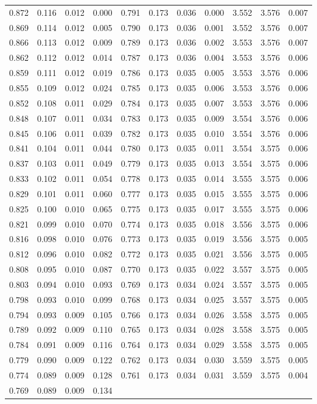 \begin{table}[H]
\begin{tabular}{rrrrrrrrrrr}
        0.872 & 0.116 & 0.012 & 0.000 & 0.791 & 0.173 & 0.036 & 0.000 & 3.552 & 3.576 & 0.007 \\0.869 & 0.114 & 0.012 & 0.005 & 0.790 & 0.173 & 0.036 & 0.001 & 3.552 & 3.576 & 0.007 \\0.866 & 0.113 & 0.012 & 0.009 & 0.789 & 0.173 & 0.036 & 0.002 & 3.553 & 3.576 & 0.007 \\0.862 & 0.112 & 0.012 & 0.014 & 0.787 & 0.173 & 0.036 & 0.004 & 3.553 & 3.576 & 0.006 \\0.859 & 0.111 & 0.012 & 0.019 & 0.786 & 0.173 & 0.035 & 0.005 & 3.553 & 3.576 & 0.006 \\0.855 & 0.109 & 0.012 & 0.024 & 0.785 & 0.173 & 0.035 & 0.006 & 3.553 & 3.576 & 0.006 \\0.852 & 0.108 & 0.011 & 0.029 & 0.784 & 0.173 & 0.035 & 0.007 & 3.553 & 3.576 & 0.006 \\0.848 & 0.107 & 0.011 & 0.034 & 0.783 & 0.173 & 0.035 & 0.009 & 3.554 & 3.576 & 0.006 \\0.845 & 0.106 & 0.011 & 0.039 & 0.782 & 0.173 & 0.035 & 0.010 & 3.554 & 3.576 & 0.006 \\0.841 & 0.104 & 0.011 & 0.044 & 0.780 & 0.173 & 0.035 & 0.011 & 3.554 & 3.575 & 0.006 \\0.837 & 0.103 & 0.011 & 0.049 & 0.779 & 0.173 & 0.035 & 0.013 & 3.554 & 3.575 & 0.006 \\0.833 & 0.102 & 0.011 & 0.054 & 0.778 & 0.173 & 0.035 & 0.014 & 3.555 & 3.575 & 0.006 \\0.829 & 0.101 & 0.011 & 0.060 & 0.777 & 0.173 & 0.035 & 0.015 & 3.555 & 3.575 & 0.006 \\0.825 & 0.100 & 0.010 & 0.065 & 0.775 & 0.173 & 0.035 & 0.017 & 3.555 & 3.575 & 0.006 \\0.821 & 0.099 & 0.010 & 0.070 & 0.774 & 0.173 & 0.035 & 0.018 & 3.556 & 3.575 & 0.006 \\0.816 & 0.098 & 0.010 & 0.076 & 0.773 & 0.173 & 0.035 & 0.019 & 3.556 & 3.575 & 0.005 \\0.812 & 0.096 & 0.010 & 0.082 & 0.772 & 0.173 & 0.035 & 0.021 & 3.556 & 3.575 & 0.005 \\0.808 & 0.095 & 0.010 & 0.087 & 0.770 & 0.173 & 0.035 & 0.022 & 3.557 & 3.575 & 0.005 \\0.803 & 0.094 & 0.010 & 0.093 & 0.769 & 0.173 & 0.034 & 0.024 & 3.557 & 3.575 & 0.005 \\0.798 & 0.093 & 0.010 & 0.099 & 0.768 & 0.173 & 0.034 & 0.025 & 3.557 & 3.575 & 0.005 \\0.794 & 0.093 & 0.009 & 0.105 & 0.766 & 0.173 & 0.034 & 0.026 & 3.558 & 3.575 & 0.005 \\0.789 & 0.092 & 0.009 & 0.110 & 0.765 & 0.173 & 0.034 & 0.028 & 3.558 & 3.575 & 0.005 \\0.784 & 0.091 & 0.009 & 0.116 & 0.764 & 0.173 & 0.034 & 0.029 & 3.558 & 3.575 & 0.005 \\0.779 & 0.090 & 0.009 & 0.122 & 0.762 & 0.173 & 0.034 & 0.030 & 3.559 & 3.575 & 0.005 \\0.774 & 0.089 & 0.009 & 0.128 & 0.761 & 0.173 & 0.034 & 0.031 & 3.559 & 3.575 & 0.004 \\0.769 & 0.089 & 0.009 & 0.134 & 
\end{tabular}
\end{table}
